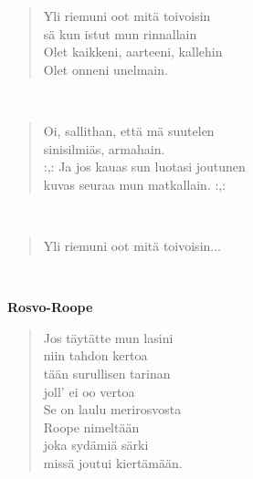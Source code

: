 \noindent\begin{minipage}{\linewidth}
\begin{verse}
	Yli riemuni oot mitä toivoisin\\
	sä kun istut mun rinnallain\\
	Olet kaikkeni, aarteeni, kallehin\\
	Olet onneni unelmain.\\
\end{verse}
\end{minipage}\\[10pt]
\noindent\begin{minipage}{\linewidth}
\begin{verse}
	Oi, sallithan, että mä suutelen\\
	sinisilmiäs, armahain.\\
	\hspace{0pt-\widthof{:,: }}:,: Ja jos kauas sun luotasi joutunen\\
	kuvas seuraa mun matkallain. :,:\\
\end{verse}
\end{minipage}\\[10pt]
\noindent\begin{minipage}{\linewidth}
\begin{verse}
	Yli riemuni oot mitä toivoisin...\\
\end{verse}
\end{minipage}\\[10pt]
%
%
\noindent\begin{minipage}{\linewidth}
\vspace{5pt}
\parbox[t]{0.85\linewidth}{\raggedright {\large\bf Rosvo-Roope}\\[6pt]}
\begin{verse}
	Jos täytätte mun lasini\\
	niin tahdon kertoa\\
	tään surullisen tarinan\\
	joll' ei oo vertoa\\
	Se on laulu merirosvosta\\
	Roope nimeltään\\
	joka sydämiä särki\\
	missä joutui kiertämään.\\
\end{verse}
\end{minipage}\\[10pt]
